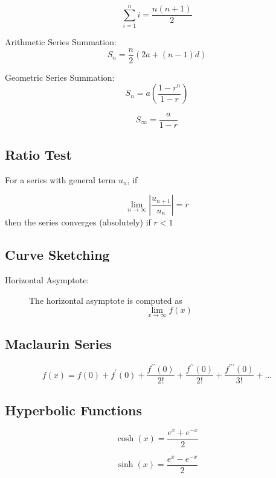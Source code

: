 ﻿ \documentclass[a4paper,12pt]{article}
\begin{document}
	\[ \sum_{i=1}^{n} i = \frac{n(n+1)}{2}\]
	
	Arithmetic Series Summation:
	\[ S_n = \frac{n}{2} \left(2a + (n-1) d \right)\]
	
	Geometric Series Summation:
	\[ S_n = a\left(\frac{1-r^n}{1-r}\right)\]
	
	\[ S_\infty = \frac{a}{1-r}\]

	\subsection*{Ratio Test}
	
	For a series with general term $u_n$, if
	
	\[ \lim_{n \to \infty } \left| \frac{u_{n+1}}{u_n} \right| = r\]
	then the series converges (absolutely) if $r<1$


	
	
\subsection*{Curve Sketching}
\begin{description}
	\item[Horizontal Asymptote:] The horizontal asymptote is computed as
		\[ \lim_{x \to \infty } f(x) \]
\end{description}
	
			\subsection*{Maclaurin Series}
			\[f(x) = f(0) + f^{\prime}(0) + \frac{f^{\prime \prime}(0)}{2!} + \frac{f^{\prime \prime}(0)}{2!} + \frac{f^{\prime\prime \prime}(0)}{3!} + \ldots \]
	
	\subsection*{Hyperbolic Functions }
	
	\[ \cosh(x)  =  \frac{e^{x} + e^{-x}}{2} \]
	
	\[ \sinh(x)  = \frac{e^{x} - e^{-x}}{2} \]
	
	
\end{document}
